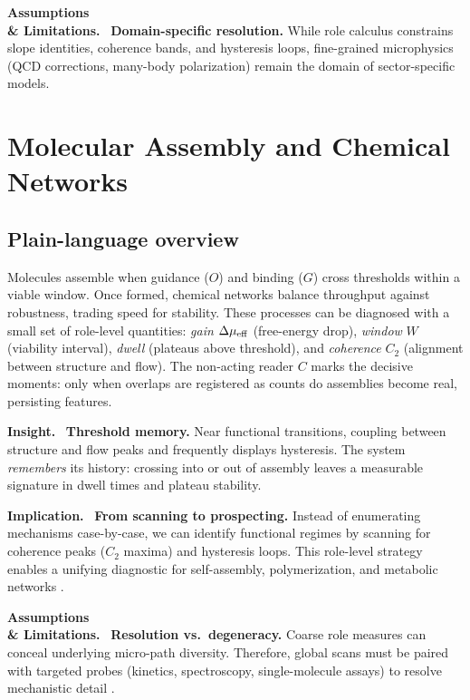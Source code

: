 \documentclass[12pt,a4paper,oneside]{scrreprt}
\newenvironment{insight}{\par\vspace{0.5em}\noindent\textbf{Insight.}\ }{\par\vspace{0.5em}}
\newenvironment{implication}{\par\vspace{0.5em}\noindent\textbf{Implication.}\ }{\par\vspace{0.5em}}
\newenvironment{limitation}{\par\vspace{0.5em}\noindent\textbf{Assumptions \\ \& Limitations.}\ }{\par\vspace{0.5em}}
\begin{document}
\begin{limitation}
\textbf{Domain-specific resolution.} 
While role calculus constrains slope identities, coherence bands, 
and hysteresis loops, fine-grained microphysics (QCD corrections, 
many-body polarization) remain the domain of sector-specific models. 
\end{limitation}

\chapter{Molecular Assembly and Chemical Networks}\label{ch:molecular-networks}

\section*{Plain-language overview}

Molecules assemble when guidance ($O$) and binding ($G$) 
cross thresholds within a viable window. 
Once formed, chemical networks balance throughput 
against robustness, trading speed for stability. 
These processes can be diagnosed with a small set of 
role-level quantities: 
\emph{gain} $\Delta\mu_{\rm eff}$ (free-energy drop), 
\emph{window} $W$ (viability interval), 
\emph{dwell} (plateaus above threshold), 
and \emph{coherence} $C_2$ (alignment between structure and flow). 
The non-acting reader $C$ marks the decisive moments: 
only when overlaps are registered as counts do 
assemblies become real, persisting features. 

\begin{insight}
\textbf{Threshold memory.} 
Near functional transitions, coupling between structure and flow 
peaks and frequently displays hysteresis. 
The system \emph{remembers} its history: 
crossing into or out of assembly leaves a measurable signature 
in dwell times and plateau stability.
\end{insight}

\begin{implication}
\textbf{From scanning to prospecting.} 
Instead of enumerating mechanisms case-by-case, 
we can identify functional regimes by scanning for coherence peaks 
($C_2$ maxima) and hysteresis loops. 
This role-level strategy enables a unifying diagnostic 
for self-assembly, polymerization, and metabolic networks 
\citep{Whitesides2002SelfAssembly,Prigogine1977Order}.
\end{implication}

\begin{limitation}
\textbf{Resolution vs.\ degeneracy.} 
Coarse role measures can conceal underlying micro-path diversity. 
Therefore, global scans must be paired with targeted probes 
(kinetics, spectroscopy, single-molecule assays) 
to resolve mechanistic detail \citep{Alberts2015Cell}.
\end{limitation}
\end{document}
